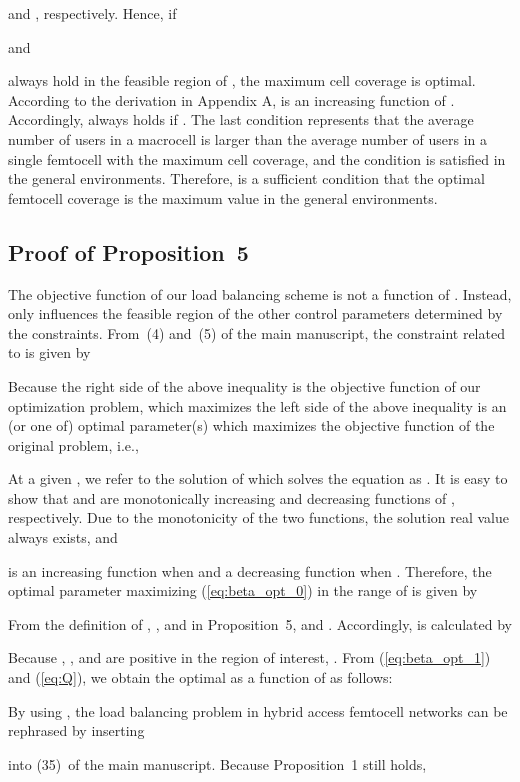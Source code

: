\documentclass[journal]{IEEEtran}
\begin{document}
and
, respectively.
Hence, if

and

always hold in the feasible region of , the maximum cell coverage is optimal.
According to the derivation in Appendix A,
 is an increasing function of .
Accordingly, 
always holds if .
The last condition represents that the average number of users in a macrocell is larger than
the average number of users in a single femtocell with the maximum cell coverage, and the condition is satisfied
in the general environments. Therefore,  is a sufficient condition that the optimal femtocell coverage is the maximum value in the general environments.


\subsection{Proof of Proposition~5}
\label{appendix:proof5}
The objective function of our load balancing scheme is not a function of .
Instead,  only influences the feasible region of the other control parameters
 determined by the constraints.
From~(4) and~(5) of the main manuscript, the constraint related to  is given by

Because the right side of the above inequality is the objective function of our optimization problem,
 which maximizes the left side of the above inequality
is an (or one of) optimal parameter(s) which maximizes the objective function of
the original problem, i.e.,

At a given , we refer to the solution of  which solves the equation
 as .
It is easy to show that  and 
are monotonically increasing and decreasing functions of , respectively.
Due to the monotonicity of the two functions, the solution real value  always exists, and

 is an increasing function when
 and a decreasing function when .
Therefore, the optimal parameter  maximizing (\ref{eq:beta_opt_0})
in the range of  is given by

From the definition of , 
, and  in Proposition~5,
 and .
Accordingly,  is calculated by

Because  , , and  are positive in
the region of interest, .
From (\ref{eq:beta_opt_1}) and (\ref{eq:Q}), we obtain the optimal  as a function of  as follows:


By using , the load balancing problem in hybrid access femtocell networks
can be rephrased by inserting

into (35)~of the main manuscript.
Because Proposition~1 still holds,
\end{document}
